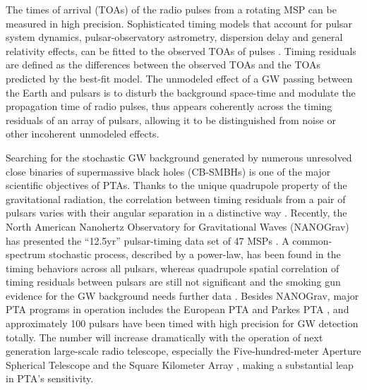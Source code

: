\documentclass[times,tight]{aastex631}
\begin{document}
The times of arrival (TOAs) of the radio pulses from a rotating MSP can be measured in high precision.
Sophisticated timing models that account for pulsar system dynamics, pulsar-observatory astrometry, dispersion delay and general relativity effects, can be fitted to the observed TOAs of pulses \citep{edwards2006, luo2020}.
Timing residuals are defined as the differences between the observed TOAs and the TOAs predicted by the best-fit model.
The unmodeled effect of a GW passing between the Earth and pulsars is to disturb the background space-time and modulate the propagation time of radio pulses, thus appears coherently across the timing residuals of an array of pulsars, allowing it to be distinguished from noise or other incoherent unmodeled effects.

Searching for the stochastic GW background generated by numerous unresolved close binaries of supermassive black holes (CB-SMBHs) is one of the major scientific objectives of PTAs.
Thanks to the unique quadrupole property of the gravitational radiation, the correlation between timing residuals from a pair of pulsars varies with their angular separation in a distinctive way \citep{hellings1983}.
Recently, the North American Nanohertz Observatory for Gravitational Waves (NANOGrav) has presented the ``12.5yr'' pulsar-timing data set of 47 MSPs \citep{alam2021}.
A common-spectrum stochastic process, described by a power-law, has been found in the timing behaviors across all pulsars, whereas quadrupole spatial correlation of timing residuals between pulsars are still not significant and the smoking gun evidence for the GW background needs further data \citep{arzoumanian202012}.
Besides NANOGrav, major PTA programs in operation includes the European PTA \citep{desvignes2016} and Parkes PTA \citep{kerr2020}, and approximately 100 pulsars have been timed with high precision for GW detection totally.
The number will increase dramatically with the operation of next generation large-scale radio telescope, especially the Five-hundred-meter Aperture Spherical Telescope \citep[FAST;][]{lee2016} and the Square Kilometer Array \citep[SKA;][]{weltman2020}, making a substantial leap in PTA's sensitivity.
\end{document}
